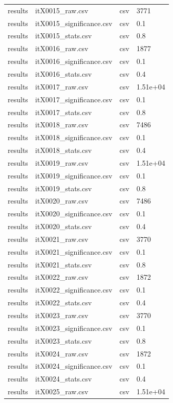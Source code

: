 \begin{landscape}
\begin{longtable}{p{}p{}p{}p{}}
results & itX0015\_raw.csv & csv & 3771 \\
results & itX0015\_significance.csv & csv & 0.1 \\
results & itX0015\_stats.csv & csv & 0.8 \\
results & itX0016\_raw.csv & csv & 1877 \\
results & itX0016\_significance.csv & csv & 0.1 \\
results & itX0016\_stats.csv & csv & 0.4 \\
results & itX0017\_raw.csv & csv & 1.51e+04 \\
results & itX0017\_significance.csv & csv & 0.1 \\
results & itX0017\_stats.csv & csv & 0.8 \\
results & itX0018\_raw.csv & csv & 7486 \\
results & itX0018\_significance.csv & csv & 0.1 \\
results & itX0018\_stats.csv & csv & 0.4 \\
results & itX0019\_raw.csv & csv & 1.51e+04 \\
results & itX0019\_significance.csv & csv & 0.1 \\
results & itX0019\_stats.csv & csv & 0.8 \\
results & itX0020\_raw.csv & csv & 7486 \\
results & itX0020\_significance.csv & csv & 0.1 \\
results & itX0020\_stats.csv & csv & 0.4 \\
results & itX0021\_raw.csv & csv & 3770 \\
results & itX0021\_significance.csv & csv & 0.1 \\
results & itX0021\_stats.csv & csv & 0.8 \\
results & itX0022\_raw.csv & csv & 1872 \\
results & itX0022\_significance.csv & csv & 0.1 \\
results & itX0022\_stats.csv & csv & 0.4 \\
results & itX0023\_raw.csv & csv & 3770 \\
results & itX0023\_significance.csv & csv & 0.1 \\
results & itX0023\_stats.csv & csv & 0.8 \\
results & itX0024\_raw.csv & csv & 1872 \\
results & itX0024\_significance.csv & csv & 0.1 \\
results & itX0024\_stats.csv & csv & 0.4 \\
results & itX0025\_raw.csv & csv & 1.51e+04 \\

\end{longtable}
\end{landscape}
